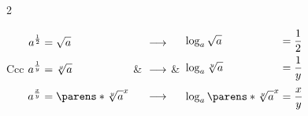 \begin{multicols}{2}
\begin{CheatsheetEntryFrame}
\begin{center}
\begin{tabularx}{\textwidth}{Ccc}
            $\W
                        \begin{aligned}
                            \Y a^{\frac{1}{2}} &= \sqrt{a} \\
                            \Y a^{\frac{1}{y}} &= \sqrt[y]{a} \\
                            \Y a^{\frac{x}{y}} &= \parens*{\sqrt[y]{a}}^x
                        \end{aligned}
            $
                &
                    $\W
                        \begin{gathered}
                            \Y \longrightarrow \\
                            \Y \longrightarrow \\
                            \Y \longrightarrow
                        \end{gathered}
                    $
                &
                    $\W
                        \begin{alignedat}{2}
                            \Y & \log_a{\sqrt{a}}                &&= \frac{1}{2} \\
                            \Y & \log_a{\sqrt[y]{a}}             &&= \frac{1}{y} \\
                            \Y & \log_a{\parens*{\sqrt[y]{a}}^x} &&= \frac{x}{y}
                        \end{alignedat}
                    $
                \\

        \end{tabularx}
        \end{center}

    \end{CheatsheetEntryFrame}

    \begin{CheatsheetEntryFrame}


\end{CheatsheetEntryFrame}
\end{multicols}
